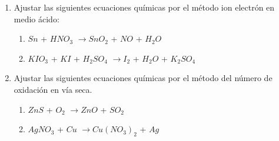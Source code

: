\documentclass[../Práctica.root.tex]{subfiles}
\newcommand{\lra}{\ensuremath{\longrightarrow{}}}
\begin{document}
\begin{enumerate}
    \item Ajustar las siguientes ecuaciones químicas por el método ion electrón en medio ácido:
          \begin{enumerate}
              \item $Sn$ + $HNO_3$ \lra $SnO_2$ + $NO$ + $H_2O$
              \item $KIO_3$ + $KI$ + $H_2SO_4$ \lra $I_2$ + $H_2O$ + $K_2SO_4$
          \end{enumerate}

    \item Ajustar las siguientes ecuaciones químicas por el método del número de oxidación en vía
          seca.
          \begin{enumerate}
              \item $ZnS$ + $O_2$ \lra $ZnO$ + $SO_2$
              \item $AgNO_3$ + $Cu$ \lra $Cu(NO_3)_2$ + $Ag$
          \end{enumerate}
\end{enumerate}
\end{document}
